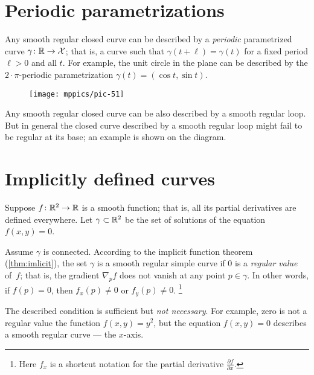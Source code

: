 \section{Periodic parametrizations}

Any smooth regular closed curve can be described by a \emph{periodic} parametrized curve $\gamma\colon \mathbb{R}\to \mathcal{X}$; that is, a curve such that $\gamma(t+\ell)=\gamma(t)$ for a fixed period $\ell > 0$ and all $t$.
For example, the unit circle in the plane can be described by the $2{\cdot}\pi$-periodic parametrization $\gamma(t)=(\cos t,\sin t)$.

{

\begin{wrapfigure}{o}{17 mm}
\vskip-2mm
\centering
\texttt{[image: mppics/pic-51]}
\end{wrapfigure}

Any smooth regular closed curve can be also described by a smooth regular loop.
But in general the closed curve described by a smooth regular loop might fail to be regular at its base; an example is shown on the diagram.

}

\section{Implicitly defined curves}\label{sec:implicit-curves}

Suppose $f\colon\mathbb{R}^2\to \mathbb{R}$ is a smooth function; 
that is, all its partial derivatives are defined everywhere.
Let $\gamma\subset \mathbb{R}^2$ be the set of solutions of the equation $f(x,y)=0$.

Assume $\gamma$ is connected.
According to the implicit function theorem (\ref{thm:imlicit}), the set $\gamma$ is a smooth regular simple curve if $0$ is a \emph{regular value} of~$f$; that is, the gradient $\nabla_p f$ does not vanish at any point $p\in \gamma$.
In other words, if $f(p)=0$, then   
$f_x(p)\ne 0$ or $f_y(p)\ne 0$.%
\footnote{Here $f_x$ is a shortcut notation for the partial derivative
$\tfrac{\partial f}{\partial x}$.}

The described condition is sufficient but {}\emph{not necessary}.
For example, zero is not a regular value the function $f(x,y)=y^2$, but the equation $f(x,y)=0$ describes a smooth regular curve --- the $x$-axis.


